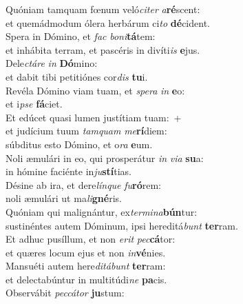 \evenverse Quóniam tamquam fœnum veló\textit{ci}\textit{ter} \textit{a}\textbf{ré}scent:~\*\\
\evenverse et quemádmodum ólera herbárum ci\textit{to} \textbf{dé}cident.\\
\oddverse Spera in Dómino, et \textit{fac} \textit{bo}\textit{ni}\textbf{tá}tem:~\*\\
\oddverse et inhábita terram, et pascéris in divíti\textit{is} \textbf{e}jus.\\
\evenverse Dele\textit{ctá}\textit{re} \textit{in} \textbf{Dó}mino:~\*\\
\evenverse et dabit tibi petitiónes cor\textit{dis} \textbf{tu}i.\\
\oddverse Revéla Dómino viam tuam, et \textit{spe}\textit{ra} \textit{in} \textbf{e}o:~\*\\
\oddverse et i\textit{pse} \textbf{fá}ciet.\\
\evenverse Et edúcet quasi lumen justítiam tuam:~+\\
\evenverse  et judícium tuum \textit{tam}\textit{quam} \textit{me}\textbf{rí}diem:~\*\\
\evenverse súbditus esto Dómino, et o\textit{ra} \textbf{e}um.\\
\oddverse Noli æmulári in eo, qui prosperátur \textit{in} \textit{vi}\textit{a} \textbf{su}a:~\*\\
\oddverse in hómine faciénte in\textit{ju}\textbf{stí}tias.\\
\evenverse Désine ab ira, et dere\textit{lín}\textit{que} \textit{fu}\textbf{ró}rem:~\*\\
\evenverse noli æmulári ut ma\textit{li}\textbf{gné}ris.\\
\oddverse Quóniam qui malignántur, ex\textit{ter}\textit{mi}\textit{na}\textbf{bún}tur:~\*\\
\oddverse sustinéntes autem Dóminum, ipsi hereditá\textit{bunt} \textbf{ter}ram.\\
\evenverse Et adhuc pusíllum, et non \textit{e}\textit{rit} \textit{pec}\textbf{cá}tor:~\*\\
\evenverse et quæres locum ejus et non \textit{in}\textbf{vé}nies.\\
\oddverse Mansuéti autem here\textit{di}\textit{tá}\textit{bunt} \textbf{ter}ram:~\*\\
\oddverse et delectabúntur in multitúdi\textit{ne} \textbf{pa}cis.\\
\evenverse Observábit \textit{pec}\textit{cá}\textit{tor} \textbf{ju}stum:~\*\\
